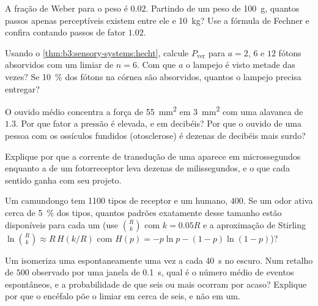 \begin{exercise}[$\star\star$]\label{exo:b3:sensory-systems:5}
A fração de Weber para o peso é $0.02$. Partindo de um peso de
\qty{100}{g}, quantos passos apenas perceptíveis existem entre ele e
\qty{10}{kg}? Use a fórmula de Fechner e confira contando passos de
fator $1.02$.
\end{exercise}

\begin{exercise}[$\star\star$]\label{exo:b3:sensory-systems:6}
Usando o \cref{thm:b3:sensory-systems:hecht}, calcule
$P_{\text{ver}}$ para $a = 2$, $6$ e $12$ fótons absorvidos com um
limiar de $n = 6$. Com que $a$ o lampejo é visto metade das vezes? Se
\qty{10}{\%} dos fótons na córnea são absorvidos, quantos o lampejo
precisa entregar?
\end{exercise}

\begin{exercise}[$\star\star$]\label{exo:b3:sensory-systems:7}
O ouvido médio concentra a força de \qty{55}{mm^2} em \qty{3}{mm^2} com
uma alavanca de $1.3$. Por que fator a pressão é elevada, e em
decibéis? Por que o ouvido de uma pessoa com os ossículos fundidos
(otosclerose) é dezenas de decibéis mais surdo?
\end{exercise}

\begin{exercise}[$\star\star$]\label{exo:b3:sensory-systems:8}
Explique por que a corrente de transdução de uma  aparece
em microssegundos enquanto a de um fotorreceptor leva dezenas de
milissegundos, e o que cada sentido ganha com seu projeto.
\end{exercise}

\begin{exercise}[$\star\star$]\label{exo:b3:sensory-systems:9}
Um camundongo tem \num{1100} tipos de receptor e um humano, $400$. Se um
odor ativa cerca de \qty{5}{\%} dos tipos, quantos padrões exatamente
desse tamanho estão disponíveis para cada um (use $\binom{R}{k}$ com
$k = 0.05R$ e a aproximação de Stirling $\ln\binom{R}{k} \approx R\,H(k/R)$
com $H(p) = -p\ln p - (1-p)\ln(1-p)$)?
\end{exercise}

\begin{exercise}[$\star\star\star$]\label{exo:b3:sensory-systems:10}
Um  isomeriza uma  espontaneamente uma vez a cada
\qty{40}{s} no escuro. Num retalho de $500$  observado por uma
janela de \qty{0.1}{s}, qual é o número médio de eventos espontâneos, e
a probabilidade de que seis ou mais ocorram por acaso? Explique por que
o encéfalo põe o limiar em cerca de seis, e não em um.
\end{exercise}

